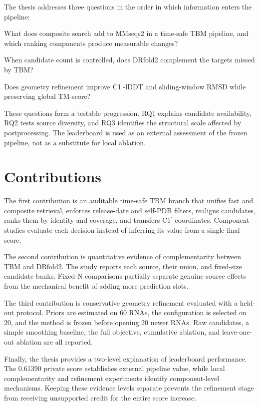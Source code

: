 \documentclass[12pt,a4paper,oneside]{report}
\newcommand{\cprime}{C1$^{\prime}$}
\begin{document}
The thesis addresses three questions in the order in which information enters the
pipeline:

\begin{description}[leftmargin=1.4cm,style=nextline]
  \item[RQ1.] What does composite search add to MMseqs2 in a time-safe TBM pipeline, and
  which ranking components produce measurable changes?
  \item[RQ2.] When candidate count is controlled, does DRfold2 complement the targets
  missed by TBM?
  \item[RQ3.] Does geometry refinement improve \cprime{}-lDDT and sliding-window RMSD
  while preserving global TM-score?
\end{description}

These questions form a testable progression. RQ1 explains candidate availability, RQ2
tests source diversity, and RQ3 identifies the structural scale affected by postprocessing.
The leaderboard is used as an external assessment of the frozen pipeline, not as a
substitute for local ablation.

\section{Contributions}

The first contribution is an auditable time-safe TBM branch that unifies fast and
composite retrieval, enforces release-date and self-PDB filters, realigns candidates,
ranks them by identity and coverage, and transfers \cprime{} coordinates. Component
studies evaluate each decision instead of inferring its value from a single final score.

The second contribution is quantitative evidence of complementarity between TBM and
DRfold2. The study reports each source, their union, and fixed-size candidate banks.
Fixed-N comparisons partially separate genuine source effects from the mechanical
benefit of adding more prediction slots.

The third contribution is conservative geometry refinement evaluated with a held-out
protocol. Priors are estimated on 60 RNAs, the configuration is selected on 20, and the
method is frozen before opening 20 newer RNAs. Raw candidates, a simple smoothing
baseline, the full objective, cumulative ablation, and leave-one-out ablation are all
reported.

Finally, the thesis provides a two-level explanation of leaderboard performance. The
0.61390 private score establishes external pipeline value, while local complementarity
and refinement experiments identify component-level mechanisms. Keeping these evidence
levels separate prevents the refinement stage from receiving unsupported credit for the
entire score increase.
\end{document}
